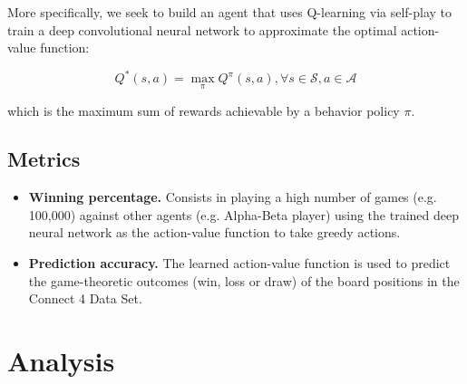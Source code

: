 \documentclass{article}
\begin{document}
More specifically, we seek to build an agent that uses Q-learning via self-play to train a deep
convolutional neural network to approximate the optimal action-value function:

\begin{equation}
Q^*(s,a) = \max\limits_\pi Q^\pi(s,a), \forall s \in \mathcal{S}, a \in \mathcal{A}
\end{equation}

\noindent which is the maximum sum of rewards achievable by a behavior policy $\pi$.

\subsection{Metrics}

\begin{itemize}

    \item \textbf{Winning percentage.} Consists in playing a high number of games (e.g. 100,000)
        against other agents (e.g. Alpha-Beta player) using the trained deep neural network as the
        action-value function to take greedy actions.
        
    \item \textbf{Prediction accuracy.} The learned action-value function is used to predict the
        game-theoretic outcomes (win, loss or draw) of the board positions in the Connect 4 Data
        Set.

\end{itemize}




\section{Analysis}
\end{document}
